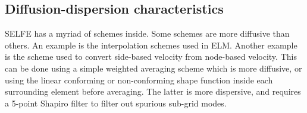 	\subsection{Diffusion-dispersion characteristics}
  SELFE has a myriad of schemes inside. Some schemes are more diffusive than others. An example is the interpolation schemes used in
ELM. Another example is the scheme used to convert side-based velocity from node-based velocity. This can be done using a simple
weighted averaging scheme which is more diffusive, or using the linear conforming or non-conforming shape function inside each
surrounding element before averaging. The latter is more dispersive, and requires a 5-point Shapiro filter to filter out spurious
sub-grid modes. 
